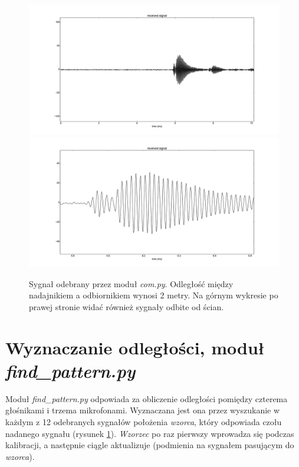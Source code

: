 \begin{figure}[h!]
    \centering
    \includegraphics[width=1.15\textwidth, trim= 47mm 0mm 0mm 0mm,clip]{com_output_2m_1}
    \includegraphics[width=1.15\textwidth, trim= 47mm 0mm 0mm 0mm,clip]{com_output_2m_2}
    \caption{Sygnał odebrany przez moduł \textit{com.py}. 
    Odległość między nadajnikiem a odbiornikiem wynosi 2 metry.
    Na górnym wykresie po prawej stronie widać również sygnały odbite od ścian.
    }
    \label{fig:com_output_2m}
\end{figure}

\newpage
\section{Wyznaczanie odległości, moduł \textit{find\_pattern.py}}

Moduł \textit{find\_pattern.py} odpowiada za obliczenie odległości pomiędzy czterema głośnikami i trzema mikrofonami.
Wyznaczana jest ona przez wyszukanie w każdym z 12 odebranych sygnałów  położenia \textit{wzorca}, który 
odpowiada czołu nadanego sygnału (rysunek \ref{fig:com_output_2m}).
\textit{Wzorzec} po raz pierwszy wprowadza się podczas kalibracji, a następnie ciągle aktualizuje 
(podmienia na sygnałem pasującym do \textit{wzorca}).

